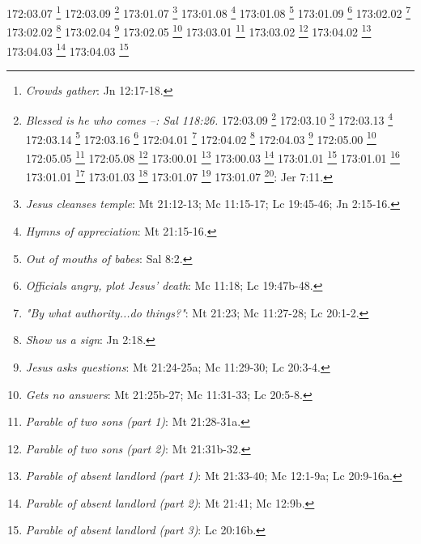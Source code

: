 172:03.07 \footnote{\textit{Crowds gather}: Jn 12:17-18.}
172:03.09 \footnote{\textit{Blessed is he who comes --: Sal 118:26.}
172:03.09 \footnote{\textit{Triumphful entry into Jerusalem}: Mt 21:7b-9; Mc 11:7b-10; Lc 19:35b-38; Jn 12:12-14a.}
172:03.10 \footnote{\textit{Jesus' lament for Jerusalem}: Lc 19:41-44.}
172:03.13 \footnote{\textit{Jesus defends entry}: Lc 19:39-40.}
172:03.14 \footnote{\textit{Pharisees report to Sanhedrin}: Lc 12:19.}
172:03.16 \footnote{\textit{Many ask "Who is Jesus?"}: Mt 21:10-11a.}
172:04.01 \footnote{\textit{Jesus visits temple}: Mc 11:11a.}
172:04.02 \footnote{\textit{The widow's mite}: Mc 12:41-44; Lc 21:1-4.}
172:04.03 \footnote{\textit{To Bethany}: Mc 11:11b.}
172:05.00 \footnote{\textit{The Apostles' attitude}: Jn 12:16a.}
172:05.05 \footnote{\textit{Zechariah's prophecy}: Zac 9:9.}
172:05.08 \footnote{\textit{Zechariah's prophecy fulfilled}: Zac 9:9.}
173:00.01 \footnote{\textit{Jesus goes to Jerusalem}: Mc 11:12a; Jn 2:13.}
173:00.03 \footnote{\textit{Arrival at temple}: Mt 21:12a; Mc 11:15a; Lc 19:45a.}
173:01.01 \footnote{\textit{Commerce in Temple courts}: Jn 2:14a.}
173:01.01 \footnote{\textit{Sacrifice animals "without blemish"}: Lv 22:18-25.}
173:01.01 \footnote{\textit{Sale of unblemished animals}: Mt 21:12a; Mc 11:15a; Lc 19:45b; Jn 2:14a.}
173:01.03 \footnote{\textit{Money changers}: Mt 21:12b; Mc 11:15b; Lc 19:45b; Jn 2:14.}
173:01.07 \footnote{\textit{Father's a house of prayer}: Is 56:7.}
173:01.07 \footnote{\textit{Father's house}: den of thieves}: Jer 7:11.}
173:01.07 \footnote{\textit{Jesus cleanses temple}: Mt 21:12-13; Mc 11:15-17; Lc 19:45-46; Jn 2:15-16.}
173:01.08 \footnote{\textit{Hymns of appreciation}: Mt 21:15-16.}
173:01.08 \footnote{\textit{Out of mouths of babes}: Sal 8:2.}
173:01.09 \footnote{\textit{Officials angry, plot Jesus' death}: Mc 11:18; Lc 19:47b-48.}
173:02.02 \footnote{\textit{"By what authority...do things?"}: Mt 21:23; Mc 11:27-28; Lc 20:1-2.}
173:02.02 \footnote{\textit{Show us a sign}: Jn 2:18.}
173:02.04 \footnote{\textit{Jesus asks questions}: Mt 21:24-25a; Mc 11:29-30; Lc 20:3-4.}
173:02.05 \footnote{\textit{Gets no answers}: Mt 21:25b-27; Mc 11:31-33; Lc 20:5-8.}
173:03.01 \footnote{\textit{Parable of two sons (part 1)}: Mt 21:28-31a.}
173:03.02 \footnote{\textit{Parable of two sons (part 2)}: Mt 21:31b-32.}
173:04.02 \footnote{\textit{Parable of absent landlord (part 1)}: Mt 21:33-40; Mc 12:1-9a; Lc 20:9-16a.}
173:04.03 \footnote{\textit{Parable of absent landlord (part 2)}: Mt 21:41; Mc 12:9b.}
173:04.03 \footnote{\textit{Parable of absent landlord (part 3)}: Lc 20:16b.}
